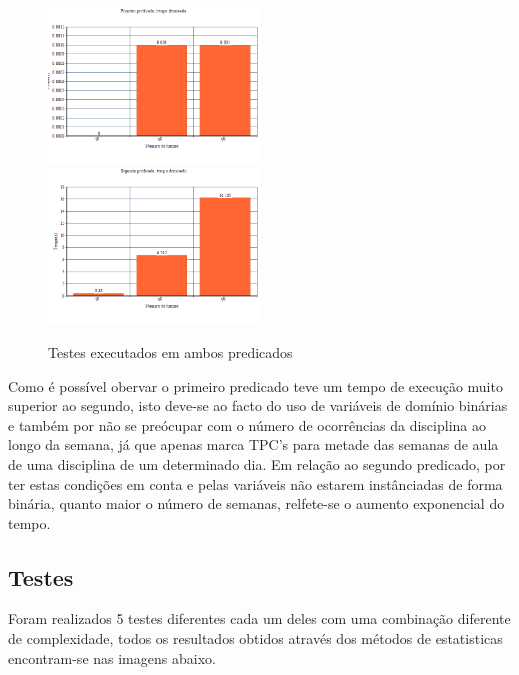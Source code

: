 \documentclass{llncs}
\begin{document}
\begin{figure}
\includegraphics[width=0.5\textwidth]{g1}
\includegraphics[width=0.5\textwidth]{g2}
\caption{Testes executados em ambos predicados}
\end{figure}
\FloatBarrier

Como é possível obervar o primeiro predicado teve um tempo de execução muito superior ao segundo, isto deve-se ao facto do uso de variáveis de domínio binárias e também por não se preócupar com o número de ocorrências da disciplina ao longo da semana, já que apenas marca TPC's para metade das semanas de aula de uma disciplina de um determinado dia.
Em relação ao segundo predicado, por ter estas condições em conta e pelas variáveis não estarem instânciadas de forma binária, quanto maior o número de semanas, relfete-se o aumento exponencial do tempo.

\subsection{ Testes}

Foram realizados 5 testes diferentes cada um deles com uma combinação diferente de complexidade, todos os resultados obtidos através dos métodos de estatisticas encontram-se nas imagens abaixo.
\end{document}
